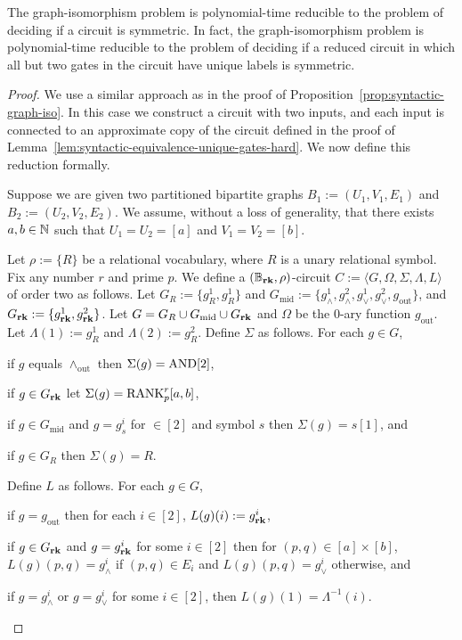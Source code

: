 \documentclass[../paper.tex]{subfiles}
\begin{document}
\begin{prop}
  The graph-isomorphism problem is polynomial-time reducible to the problem of
  deciding if a circuit is symmetric. In fact, the graph-isomorphism problem is
  polynomial-time reducible to the problem of deciding if a reduced circuit in
  which all but two gates in the circuit have unique labels is symmetric.
  \label{prop:graph-iso-symmetric}
\end{prop}
\begin{proof}
  We use a similar approach as in the proof of
  Proposition~\ref{prop:syntactic-graph-iso}. In this case we construct a
  circuit with two inputs, and each input is connected to an approximate copy of
  the circuit defined in the proof of
  Lemma~\ref{lem:syntactic-equivalence-unique-gates-hard}. We now define this
  reduction formally.
 
  Suppose we are given two partitioned bipartite graphs $B_1 := (U_1, V_1, E_1)$
  and $B_2 := (U_2, V_2, E_2)$. We assume, without a loss of generality, that
  there exists $a, b \in \mathbb{N}$ such that $U_1 = U_2 = [a]$ and $V_1 = V_2 =
  [b]$.

  Let $\rho:= \{R\}$ be a relational vocabulary, where $R$ is a unary relational
  symbol. Fix any number $r$ and prime $p$. We define a $(\mathbb{B}_{\text{\textbf{rk}}}, \rho)$-circuit $C
  := \langle G, \Omega, \Sigma, \Lambda, L \rangle$ of order two as follows. Let
  $G_{R} := \{g^1_{R}, g^1_{R}\}$ and $G_{\text{mid}} := \{g^1_{\land},
  g^2_\land, g^1_\lor, g^2_\lor , g_{\text{out}}\}$, and $G_{\text{\textbf{rk}}} : = \{
  g^1_{\text{\textbf{rk}}}, g^2_{\text{\textbf{rk}}}\}$. Let $G = G_R \cup G_{\text{mid}} \cup G_{\text{\textbf{rk}}}$
  and $\Omega$ be the $0$-ary function $g_{\text{out}}$. Let $\Lambda(1) :=
  g^1_{R}$ and $\Lambda(2) := g^2_{R}$. Define $\Sigma$ as follows. For each $g
  \in G$,
  \begin{myitemize}
  \item if $g$ equals $\land_{\text{out}}$ then $\Sigma(g) = \text{\upshape AND}[2]$,
  \item if $g \in G_{\text{\textbf{rk}}}$ let $\Sigma(g) = \text{\upshape RANK}^r_p [a,b]$,
  \item if $g \in G_{\text{mid}}$ and $g = g^i_s$ for $ \in [2]$ and symbol $s$
    then $\Sigma(g) = s[1]$, and
  \item if $g \in G_R$ then $\Sigma(g) = R$.
  \end{myitemize}
  Define $L$ as follows. For each $g \in G$,
  \begin{myitemize}
  \item if $g = g_{\text{out}}$ then for each $i \in [2]$, $L(g)(i) :=
    g^i_{\text{\textbf{rk}}}$,
  \item if $g \in G_{\text{\textbf{rk}}}$ and $g = g^i_{\text{\textbf{rk}}}$ for some $i \in [2]$ then for
    $(p,q) \in [a]\times [b]$, $L(g)(p,q) = g^i_\land$ if $(p,q) \in E_i$ and
    $L(g)(p,q) = g^i_\lor$ otherwise, and
  \item if $g = g^i_\land$ or $g = g^i_{\lor}$ for some $i \in [2]$, then
    $L(g)(1) = \Lambda^{-1}(i)$.
  \end{myitemize}


\end{proof}
\end{document}
